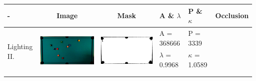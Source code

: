 \begin{table}
\begin{tabular}{|l|c|c|l|l|c|}
\hline - & Image & Mask & A \& $\lambda$ & P \& $\kappa$ & Occlusion \\ 
\hline

\multirow{4}{*}{Lighting II.} & \multirow{4}{*}{\includegraphics[scale=0.08]{../images/1/8_img.png}} & \multirow{4}{*}{\includegraphics[scale=0.08]{../images/1/8_mask.png}} & A = 368666 & P = 3339 & \multirow{4}{*}{}\\ 
& & & $\lambda$ = 0.9968 & $\kappa$ = 1.0589 & \\
&&&&&\\
&&&&&\\
\hline


\end{tabular}
\end{table}
